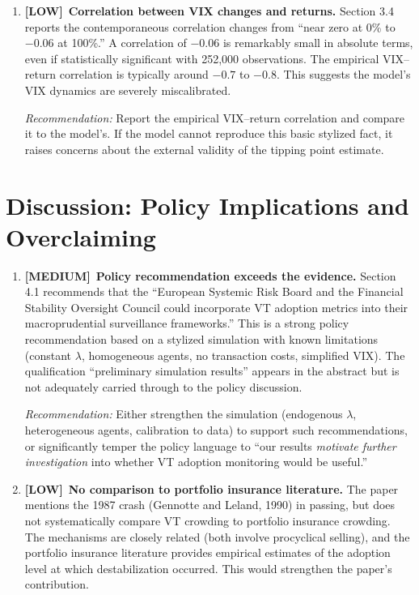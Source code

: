\documentclass[12pt,a4paper]{article}
\newcommand{\MEDIUM}{\textbf{\textcolor{medorange}{[MEDIUM]}}}
\newcommand{\LOW}{\textbf{\textcolor{lowgreen}{[LOW]}}}
\begin{document}
\begin{enumerate}[leftmargin=2em,resume]
\item \LOW\ \textbf{Correlation between VIX changes and returns.} Section 3.4 reports the contemporaneous correlation changes from ``near zero at 0\% to $-0.06$ at 100\%.'' A correlation of $-0.06$ is remarkably small in absolute terms, even if statistically significant with 252,000 observations. The empirical VIX--return correlation is typically around $-0.7$ to $-0.8$. This suggests the model's VIX dynamics are severely miscalibrated.

\textit{Recommendation:} Report the empirical VIX--return correlation and compare it to the model's. If the model cannot reproduce this basic stylized fact, it raises concerns about the external validity of the tipping point estimate.

\end{enumerate}

\section{Discussion: Policy Implications and Overclaiming}
\label{sec:discussion}

\begin{enumerate}[leftmargin=2em,resume]

\item \MEDIUM\ \textbf{Policy recommendation exceeds the evidence.} Section 4.1 recommends that the ``European Systemic Risk Board and the Financial Stability Oversight Council could incorporate VT adoption metrics into their macroprudential surveillance frameworks.'' This is a strong policy recommendation based on a stylized simulation with known limitations (constant $\lambda$, homogeneous agents, no transaction costs, simplified VIX). The qualification ``preliminary simulation results'' appears in the abstract but is not adequately carried through to the policy discussion.

\textit{Recommendation:} Either strengthen the simulation (endogenous $\lambda$, heterogeneous agents, calibration to data) to support such recommendations, or significantly temper the policy language to ``our results \emph{motivate further investigation} into whether VT adoption monitoring would be useful.''

\item \LOW\ \textbf{No comparison to portfolio insurance literature.} The paper mentions the 1987 crash (Gennotte and Leland, 1990) in passing, but does not systematically compare VT crowding to portfolio insurance crowding. The mechanisms are closely related (both involve procyclical selling), and the portfolio insurance literature provides empirical estimates of the adoption level at which destabilization occurred. This would strengthen the paper's contribution.

\end{enumerate}
\end{document}
